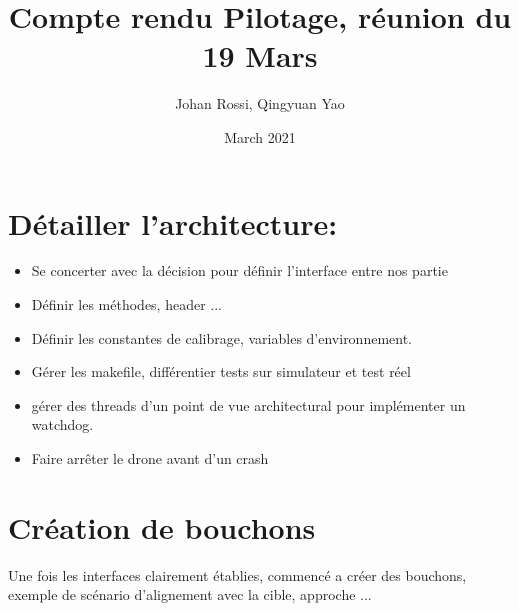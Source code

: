 \documentclass{article}
\title{Compte rendu Pilotage, réunion du 19 Mars}
\author{Johan Rossi, Qingyuan Yao}
\date{March 2021}
\begin{document}
\maketitle

\section{Détailler l'architecture:}
\begin{itemize}
    \item Se concerter avec la décision pour définir l'interface entre nos partie  
    \item Définir les méthodes, header ...
    \item Définir les constantes de calibrage, variables d'environnement.
    \item Gérer les makefile, différentier tests sur simulateur et test réel
    \item gérer des threads d'un point de vue architectural pour implémenter un watchdog.
    \item Faire arrêter le drone avant d'un crash
\end{itemize}

\section{Création de bouchons}
Une fois les interfaces clairement établies, commencé a créer des bouchons, exemple de scénario d'alignement avec la cible, approche ...
\end{document}
